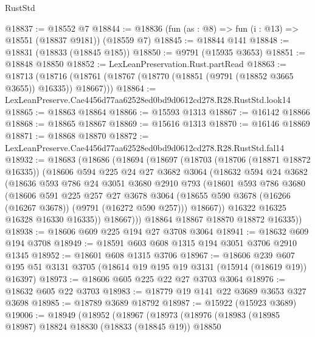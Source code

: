 \begin{lexlean}{RustStd}
\begin{coremodule}
@18837 := @18552 @7
@18844 := @18836 (fun (as : @8) => fun (i : @13) => @18551 (@18837 @9181)) (@18559 @7)
@18845 := @18844 @141
@18848 := @18831 (@18833 (@18845 @185))
@18850 := @9791 (@15935 @3653)
@18851 := @18848 @18850
@18852 := LexLeanPreservation.Rust.partRead
@18863 := @18713
    (@18716 (@18761 (@18767 (@18770 (@18851 (@9791 (@18852 @3665 @3655)) @16335)) @18667)))
@18864 := LexLeanPreserve.Cae4456d77aa62528ed0bd9d0612cd278.R28.RustStd.look14
@18865 := @18863 @18864
@18866 := @15593 @1313
@18867 := @16142 @18866
@18868 := @18865 @18867
@18869 := @15616 @1313
@18870 := @16146 @18869
@18871 := @18868 @18870
@18872 := LexLeanPreserve.Cae4456d77aa62528ed0bd9d0612cd278.R28.RustStd.fal14
@18932 := @18683
    (@18686
      (@18694
        (@18697
          (@18703
            (@18706 (@18871 @18872 @16335))
            (@18606
              @594
              @225
              @24
              @27
              @3682
              @3064
              (@18632
                @594
                @24
                @3682
                (@18636
                  @593
                  @786
                  @24
                  @3051
                  @3680
                  @2910
                  @793
                  (@18601
                    @593
                    @786
                    @3680
                    (@18606
                      @591
                      @225
                      @257
                      @27
                      @3678
                      @3064
                      (@18655 @590 @3678 (@16266 (@16267 @3678)) (@9791 (@16272 @590 @257)))
                      @18667))
                  @16322
                  @16325
                  @16328
                  @16330
                  @16335))
              @18667)))
        @18864
        @18867
        @18870
        @18872
        @16335))
@18938 := @18606 @609 @225 @194 @27 @3708 @3064
@18941 := @18632 @609 @194 @3708
@18949 := @18591 @603 @608 @1315 @194 @3051 @3706 @2910 @1345
@18952 := @18601 @608 @1315 @3706
@18967 := @18606
    @239
    @607
    @195
    @51
    @3131
    @3705
    (@18614 @19 @195 @19 @3131 (@15914 (@18619 @19)) @16397)
@18973 := @18606 @605 @225 @22 @27 @3703 @3064
@18976 := @18632 @605 @22 @3703
@18983 := @18779 @19 @141 @22 @3689 @3653 @327 @3698
@18985 := @18789 @3689 @18792
@18987 := @15922 (@15923 @3689)
@19006 := @18949
    (@18952
      (@18967
        (@18973
          (@18976
            (@18983
              (@18985 @18987)
              @18824
              @18830
              (@18833 (@18845 @19))
              @18850

\end{coremodule}
\end{lexlean}
